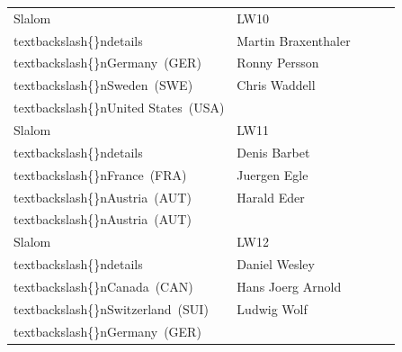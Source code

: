 \documentclass{article}
\begin{document}
\begin{tabular}{lllll}
Slalom & LW10\\textbackslash\{\}ndetails & Martin Braxenthaler\\textbackslash\{\}nGermany (GER) & Ronny Persson\\textbackslash\{\}nSweden (SWE) & Chris Waddell\\textbackslash\{\}nUnited States (USA) \\
Slalom & LW11\\textbackslash\{\}ndetails & Denis Barbet\\textbackslash\{\}nFrance (FRA) & Juergen Egle\\textbackslash\{\}nAustria (AUT) & Harald Eder\\textbackslash\{\}nAustria (AUT) \\
Slalom & LW12\\textbackslash\{\}ndetails & Daniel Wesley\\textbackslash\{\}nCanada (CAN) & Hans Joerg Arnold\\textbackslash\{\}nSwitzerland (SUI) & Ludwig Wolf\\textbackslash\{\}nGermany (GER) \\
\bottomrule
\end{tabular}
\end{document}
